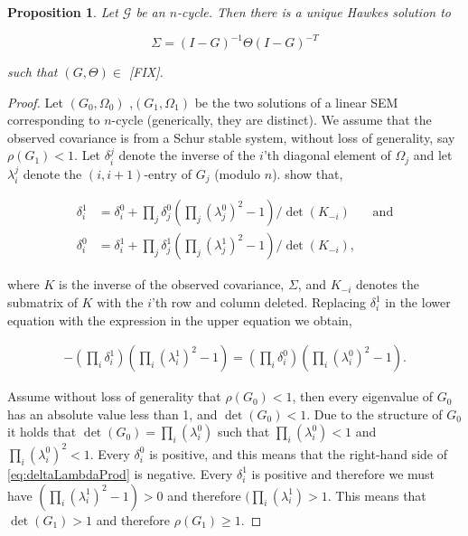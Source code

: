 \documentclass[accepted]{uai2021} %
\newtheorem{prop}[thm]{Proposition}
\begin{document}
\begin{prop}
	Let $\mathcal{G}$ be an $n$-cycle. Then there is a unique Hawkes solution 
	to 
	
	$$
	\Sigma = (I - G)^{-1}\Theta(I - G)^{-T}
	$$
	
	such that $(G, \Theta) \in $ [FIX].
\end{prop}

\begin{proof}
	Let $(G_0, \Omega_0)$ ,$(G_1, \Omega_1)$ be the two solutions of a linear 
	SEM corresponding to 
	$n$-cycle (generically, they are distinct). We assume that the observed 
	covariance is 
	from a Schur stable system, without loss of generality, say $\rho(G_1) < 
	1$. Let 
	$\delta_i^j$ denote the inverse of the $i$'th diagonal element of 
	$\Omega_j$ and let 
	$\lambda_i^j$ denote the $(i,i+1)$-entry of $G_j$ (modulo $n$). 
	\cite{drton2011} show that,
	
	\begin{align*}
	\delta_i^1 &= \delta_i^0 + \prod_j \delta_j^0 (\prod_j (\lambda_j^0)^2 - 
	1)/\det(K_{-i}) \ \ \ \ \ \ \ \  \text{and} \\
	\delta_i^0 &= \delta_i^1 + \prod_j \delta_j^1 (\prod_j (\lambda_j^1)^2 - 
	1)/\det(K_{-i}),
	\end{align*}
	
	\noindent where $K$ is the inverse of the observed covariance, $\Sigma$, 
	and $K_{-i}$ denotes the submatrix of $K$ with the $i$'th row and column 
	deleted. Replacing $\delta_i^1$ in the lower equation with the expression 
	in the upper equation we obtain, 
	
	\begin{align}
	- (\prod_i \delta_i^1) (\prod_i (\lambda_i^1)^2 - 
	1) = (\prod_i \delta_i^0) (\prod_i (\lambda_i^0)^2 - 
	1).
	\label{eq:deltaLambdaProd}
	\end{align}
	
	\noindent Assume without loss of generality that $\rho(G_0) < 1$, 
	then every eigenvalue of $G_0$ has an absolute value less than 1, and 
	$\det(G_0) < 1$. Due to the structure of $G_0$ it holds that 
	$\det(G_0) = \prod_i(\lambda_i^0)$ such that $\prod_i(\lambda_i^0) < 
	1$ 
	and $\prod_i(\lambda_i^0)^2 < 1$. Every $\delta_i^0$ is 
	positive, and this means that the right-hand side of 
	\ref{eq:deltaLambdaProd} is negative. Every $\delta_i^1$ is positive and 
	therefore we must have $(\prod_i 
	(\lambda_i^1)^2 - 
	1) > 0$ and therefore $(\prod_i 
	(\lambda_i^1) > 1$. This means that $\det(G_1) > 1$ and therefore 
	$\rho(G_1) \geq 1$.
\end{proof}
\end{document}
